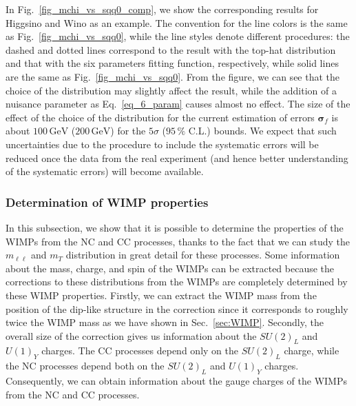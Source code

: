 \documentclass[12pt,twoside,book]{article}
\begin{document}
In Fig.~\ref{fig_mchi_vs_sqq0_comp}, we show the corresponding results for Higgsino and Wino as an example.
The convention for the line colors is the same as Fig.~\ref{fig_mchi_vs_sqq0}, while the line styles denote different procedures: the dashed and dotted lines correspond to the result with the top-hat distribution and that with the six parameters fitting function, respectively, while solid lines are the same as Fig.~\ref{fig_mchi_vs_sqq0}.
From the figure, we can see that the choice of the distribution may slightly affect the result, while the addition of a nuisance parameter as Eq.~\eqref{eq_6_param} causes almost no effect.
The size of the effect of the choice of the distribution for the current estimation of errors $\bm{\sigma}_f$ is about $100\,\mathrm{GeV}$ ($200\,\mathrm{GeV}$) for the $5\sigma$ ($95\,\%$ C.L.) bounds.
We expect that such uncertainties due to the procedure to include the systematic errors will be reduced once the data from the real experiment (and hence better understanding of the systematic errors) will become available.



\subsubsection{Determination of WIMP properties}
\label{sec_property}

In this subsection, we show that it is possible to determine the properties of the WIMPs from the NC and CC processes, thanks to the fact that we can study the $m_{\ell\ell}$ and $m_T$ distribution in great detail for these processes.
Some information about the mass, charge, and spin of the WIMPs can be extracted because the corrections to these distributions from the WIMPs are completely determined by these WIMP properties.
Firstly, we can extract the WIMP mass from the position of the dip-like structure in the correction since it corresponds to roughly twice the WIMP mass as we have shown in Sec.~\ref{sec:WIMP}.
Secondly, the overall size of the correction gives us information about the $SU(2)_L$ and $U(1)_Y$ charges.
The CC processes depend only on the $SU(2)_L$ charge, while the NC processes depend both on the $SU(2)_L$ and $U(1)_Y$ charges.
Consequently, we can obtain information about the gauge charges of the WIMPs from the NC and CC processes.
\end{document}
